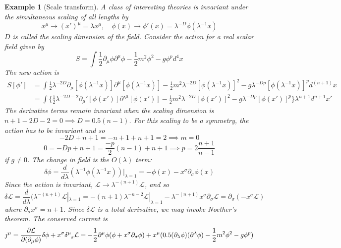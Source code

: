 \documentclass[a4paper]{article}
\newtheorem{eg}{Example}[section]
\theoremstyle{new}
\begin{document}
\begin{eg}[Scale transform]
A class of interesting theories is invariant under the simultaneous scaling of all lengths by
$$x^\mu\rightarrow(x')^\mu=\lambda x^\mu,\quad\phi(x)\rightarrow\phi'(x)=\lambda^{-D}\phi(\lambda^{-1}x)$$
$D$ is called the scaling dimension of the field. Consider the action for a real scalar field given by
$$S=\int\frac{1}{2}\partial_\mu\phi\partial^\mu\phi-\frac{1}{2}m^2\phi^2-g\phi^pd^4x$$
The new action is
\begin{align}
S[\phi']&=\int\frac{1}{2}\lambda^{-2D}\partial_\mu[\phi(\lambda^{-1}x)]\partial^\mu[\phi(\lambda^{-1}x)]-\frac{1}{2}m^2\lambda^{-2D}[\phi(\lambda^{-1}x)]^2-g\lambda^{-Dp}[\phi(\lambda^{-1}x)]^pd^{(n+1)}x\nonumber\\&=\int\bigg\{\frac{1}{2}\lambda^{-2D-2}\partial_\mu'[\phi(x')]\partial'^\mu[\phi(x')]-\frac{1}{2}m^2\lambda^{-2D}[\phi(x')]^2-g\lambda^{-Dp}[\phi(x')]^p\bigg\}\lambda^{n+1}d^{n+1}x'\nonumber
\end{align}
The derivative terms remain invariant when the scaling dimension is $n+1-2D-2=0\implies D=0.5(n-1)$. For this scaling to be a symmetry, the action has to be invariant and so
$$-2D+n+1=-n+1+n+1=2\implies m=0$$
$$0=-Dp+n+1=\frac{-p}{2}(n-1)+n+1\implies p=2\frac{n+1}{n-1}$$
if $g\neq 0$. The change in field is the $O(\lambda)$ term:
$$\delta\phi=\frac{d}{d\lambda}(\lambda^{-1}\phi(\lambda^{-1}x))|_{\lambda=1}=-\phi(x)-x^\sigma\partial_\sigma\phi(x)$$
Since the action is invariant, $\mathcal{L}\rightarrow\lambda^{-(n+1)}\mathcal{L}$, and so
$$\delta\mathcal{L}=\frac{d}{d\lambda}(\lambda^{-(n+1)}\mathcal{L}|_{\lambda=1}=-(n+1)\lambda^{-n-2}\mathcal{L}|_{\lambda=1}-\lambda^{-(n+1)}x^\sigma\partial_\sigma\mathcal{L}=\partial_\sigma(-x^\sigma\mathcal{L})$$
where $\partial_\sigma x^\sigma=n+1$. Since $\delta\mathcal{L}$ is a total derivative, we may invoke Noether's theorem. The conserved current is
$$j^\mu=\frac{\partial\mathcal{L}}{\partial(\partial_\mu\phi)}\delta\phi+x^\sigma\tensor*{\delta}{*_{}^{\mu}_{\sigma}}\mathcal{L}=-\frac{1}{2}\partial^\mu\phi(\phi+x^\sigma\partial_\sigma\phi)+x^\mu(0.5(\partial_\lambda\phi)(\partial^\lambda\phi)-\frac{1}{2}m^2\phi^2-g\phi^p)$$
\end{eg}
\newpage
\end{document}
